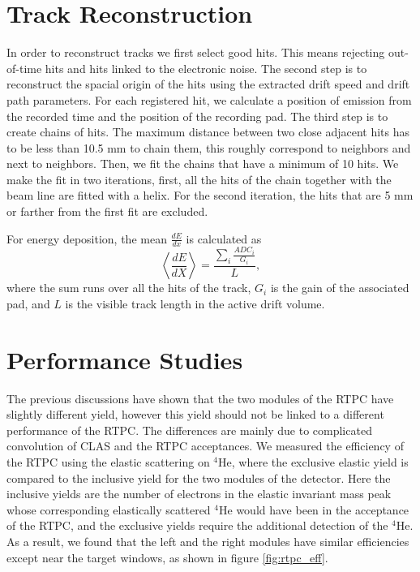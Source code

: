 \documentclass[twocolumn,showpacs,superscriptaddress,groupedaddress]{revtex4}
\begin{document}
\section{Track Reconstruction}\label{sec_rec}
In order to reconstruct tracks we first select good hits. This means rejecting 
out-of-time hits and hits linked to the electronic noise. The second step is 
to reconstruct the spacial origin of the hits using the extracted drift speed and drift path 
parameters. For each registered hit, we calculate a position of emission from 
the recorded time and the position of the recording pad. The third step 
is to create chains of hits. The maximum distance between two close adjacent 
hits has to be less than 10.5 mm to chain them, this roughly correspond to 
neighbors and next to neighbors. Then, we fit the chains that have a minimum of 
10 hits. We make the fit in two iterations, first, all the hits of the chain 
together with the beam line are fitted with a helix. For the second iteration, 
the hits that are 5 mm or farther from the first fit are excluded.

For energy deposition, the mean $\frac{dE}{dx}$ is calculated as
\begin{equation}
 \left\langle \frac{dE}{dX} \right\rangle= \frac{\sum\limits_{i} \frac{ADC_{i}}{G_i}}{L},
\end{equation}
where the sum runs over all the hits of the track, $G_{i}$ is the gain of 
the associated pad, and $L$ is the visible track length in the active drift 
volume. 

\section{Performance Studies}\label{sec_perfor}
The previous discussions have shown that the two modules of the RTPC have 
slightly different yield, however this yield should not be linked to a 
different performance of the RTPC. The differences are mainly due to 
complicated convolution of CLAS and the RTPC acceptances. We measured the 
efficiency of the RTPC using the elastic scattering on $^4$He, where the 
exclusive elastic yield is compared to the inclusive yield for the two modules 
of the detector. Here the inclusive yields are the number of electrons in the 
elastic invariant mass peak whose corresponding elastically scattered $^4$He 
would have been in the acceptance of the RTPC, and the exclusive yields require 
the additional detection of the $^4$He. As a result, we found that the left and 
the right modules have similar efficiencies except near the target windows, as 
shown in figure \ref{fig:rtpc_eff}.
\end{document}

